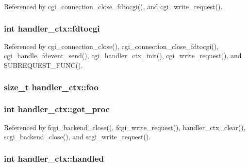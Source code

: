 Referenced by cgi\-\_\-connection\-\_\-close\-\_\-fdtocgi(), and cgi\-\_\-write\-\_\-request().

\hypertarget{structhandler__ctx_a0b203101a15edf6179c53ca1949a380f}{
\subsubsection[{fdtocgi}]{\setlength{\rightskip}{0pt plus 5cm}int handler\-\_\-ctx\-::fdtocgi}}\label{structhandler__ctx_a0b203101a15edf6179c53ca1949a380f}


Referenced by cgi\-\_\-connection\-\_\-close(), cgi\-\_\-connection\-\_\-close\-\_\-fdtocgi(), cgi\-\_\-handle\-\_\-fdevent\-\_\-send(), cgi\-\_\-handler\-\_\-ctx\-\_\-init(), cgi\-\_\-write\-\_\-request(), and S\-U\-B\-R\-E\-Q\-U\-E\-S\-T\-\_\-\-F\-U\-N\-C().

\hypertarget{structhandler__ctx_a9d0337b80c0479f8e08a4eec7c780fca}{
\subsubsection[{foo}]{\setlength{\rightskip}{0pt plus 5cm}size\-\_\-t handler\-\_\-ctx\-::foo}}\label{structhandler__ctx_a9d0337b80c0479f8e08a4eec7c780fca}
\hypertarget{structhandler__ctx_ad75f27a3509dacba99feb90f93827e4d}{
\subsubsection[{got\-\_\-proc}]{\setlength{\rightskip}{0pt plus 5cm}int handler\-\_\-ctx\-::got\-\_\-proc}}\label{structhandler__ctx_ad75f27a3509dacba99feb90f93827e4d}


Referenced by fcgi\-\_\-backend\-\_\-close(), fcgi\-\_\-write\-\_\-request(), handler\-\_\-ctx\-\_\-clear(), scgi\-\_\-backend\-\_\-close(), and scgi\-\_\-write\-\_\-request().

\hypertarget{structhandler__ctx_a9366379955fcb32c274ea4c0d21a2f15}{
\subsubsection[{handled}]{\setlength{\rightskip}{0pt plus 5cm}int handler\-\_\-ctx\-::handled}}\label{structhandler__ctx_a9366379955fcb32c274ea4c0d21a2f15}


